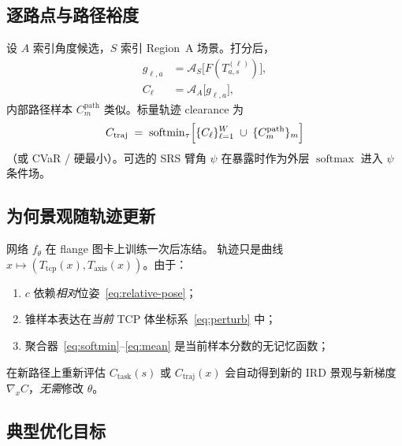 \documentclass[UTF8,a4paper,11pt,fontset=fandol]{ctexart}
\newcommand{\Tcp}{T_{\mathrm{tcp}}}
\newcommand{\Taxis}{T_{\mathrm{axis}}}
\newcommand{\softmin}{\operatorname{softmin}}
\newcommand{\softmax}{\operatorname{softmax}}
\begin{document}
\subsection{逐路点与路径裕度}
\label{sec:path-margin}

设 \(A\) 索引角度候选，\(S\) 索引 Region~A 场景。打分后，
\begin{equation}
\label{eq:waypoint-clearance}
\begin{aligned}
  g_{\ell,a}
  &=
  \mathcal{A}_{S}\bigl[F(T^{(\ell)}_{a,s})\bigr],
  \\
  C_{\ell}
  &=
  \mathcal{A}_{A}\bigl[g_{\ell,a}\bigr],
\end{aligned}
\end{equation}
内部路径样本 \(C^{\mathrm{path}}_{m}\) 类似。标量轨迹 clearance 为
\begin{equation}
\label{eq:traj-clearance}
  C_{\mathrm{traj}}
  \;=\;
  \softmin_{\tau}
  \Bigl[
    \{C_{\ell}\}_{\ell=1}^{W}
    \;\cup\;
    \{C^{\mathrm{path}}_{m}\}_{m}
  \Bigr]
\end{equation}
（或 CVaR / 硬最小）。可选的 SRS 臂角 \(\psi\) 在暴露时作为外层
\(\softmax\) 进入 \(\psi\) 条件场。

\subsection{为何景观随轨迹更新}
\label{sec:why-update}

网络 \(f_{\theta}\) 在 flange 图卡上训练一次后冻结。
轨迹只是曲线 \(x\mapsto(\Tcp(x),\Taxis(x))\)。由于：
\begin{enumerate}[leftmargin=1.6em]
  \item \(c\) 依赖\emph{相对}位姿~\eqref{eq:relative-pose}；
  \item 锥样本表达在\emph{当前} TCP 体坐标系~\eqref{eq:perturb} 中；
  \item 聚合器~\eqref{eq:softmin}--\eqref{eq:mean} 是当前样本分数的无记忆函数；
\end{enumerate}
在新路径上重新评估 \(C_{\mathrm{task}}(s)\) 或 \(C_{\mathrm{traj}}(x)\)
会自动得到新的 IRD 景观与新梯度 \(\nabla_{x}C\)，\emph{无需}修改 \(\theta\)。

\subsection{典型优化目标}
\label{sec:opt}
\end{document}
